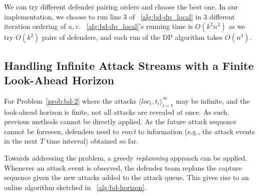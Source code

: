We can try different defender pairing orders and choose the best one. 
In our \ours implementation, we choose to run line 3 of ~\ref{alg:bd-dp_local} in 3 different iteration ordering of $u, v$.
~\ref{alg:bd-dp_local}'s running time is $O(k^2 n^3)$ as we try $O(k^2)$ pairs of defenders, and each run of the DP algorithm takes $O(n^3)$.

\subsection{Handling Infinite Attack Streams with a Finite Look-Ahead Horizon }
\label{sec:bd-hor}
For Problem~\ref{prob:bd-2} where the attacks $\big \langle loc_i, t_i\big \rangle_{i=1}^{\infty}$ may be infinite, and the look-ahead horizon is finite, not all attacks are revealed at once. As such, previous methods cannot be directly applied. 
As the future attack sequence cannot be foreseen, defenders need to \emph{react} to information (e.g., the attack events in the next $T$ time interval) obtained so far. 

Towards addressing the problem, a greedy \emph{replanning} approach can be applied. Whenever an attack event is observed, the defender team replans the capture sequence given the new attacks added to the attack queue. 
This gives rise to an online algorithm sketched in ~\ref{alg:bd-horizon}.

